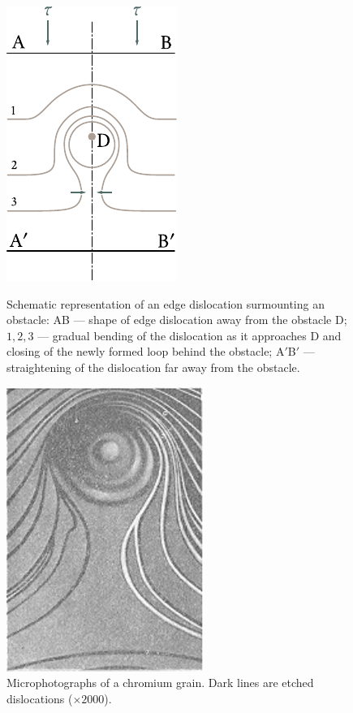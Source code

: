 \begin{figure}[t]
	\begin{minipage}[t]{0.631\linewidth}
		\begin{center}
			\includegraphics[scale=1]{figures/ch_02/fig_2_23.pdf}
			\caption[]{Schematic representation of an edge dislocation surmounting an obstacle: AB --- shape of edge dislocation away from the obstacle D; $1, 2, 3$ --- gradual bending of the dislocation as it approaches D and closing of the newly formed loop behind the obstacle; A$'$B$'$ --- straightening of the dislocation far away from the obstacle.}
			\label{fig:2_23}
		\end{center}
	\end{minipage}
	\hfill{ }%
	\begin{minipage}[t]{0.33\linewidth}
		\begin{center}
			\includegraphics[scale=0.98]{figures/ch_02/fig_2_24.pdf}
			\caption[]{Microphotographs of a chromium grain. Dark lines are etched dislocations ($\times 2000$).}
			\label{fig:2_24}
		\end{center}
	\end{minipage}
\vspace{-0.3cm}
\end{figure}

